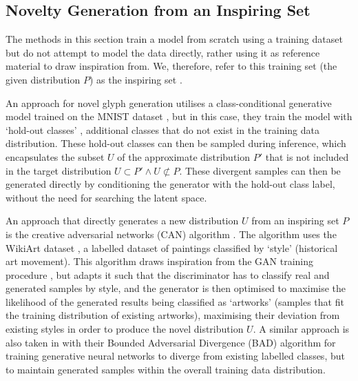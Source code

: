 \subsection{Novelty Generation from an Inspiring Set}
\label{survey:noveltygeneration}

The methods in this section train a model from scratch using a training dataset but do not attempt to model the data directly, rather using it as reference material to draw inspiration from. 
We, therefore, refer to this training set (the given distribution $P$) as the inspiring set \citep{ritchie2007some}.

An approach for novel glyph generation utilises a class-conditional generative model trained on the MNIST dataset \citep{lecun1998gradient}, but in this case, they train the model with `hold-out classes' \citep{cherti2017out}, additional classes that do not exist in the training data distribution. 
These hold-out classes can then be sampled during inference, which encapsulates the subset $U$ of the approximate distribution $P'$ that is not included in the target distribution $U \subset P' \wedge U \not\subset P$. 
These divergent samples can then be generated directly by conditioning the generator with the hold-out class label, without the need for searching the latent space. 

An approach that directly generates a new distribution $U$ from an inspiring set $P$ is the creative adversarial networks (CAN) algorithm \citep{elgammal2017can}. 
The algorithm uses the WikiArt dataset \citep{saleh2016large}, a labelled dataset of paintings classified by `style' (historical art movement). This algorithm draws inspiration from the GAN training procedure \citep{goodfellow2014generative}, but adapts it such that the discriminator has to classify real and generated samples by style, and the generator is then optimised to maximise the likelihood of the generated results being classified as `artworks' (samples that fit the training distribution of existing artworks), maximising their deviation from existing styles in order to produce the novel distribution $U$. A similar approach is also taken in \cite{chelma2022creative} with their Bounded Adversarial Divergence (BAD) algorithm for training generative neural networks to diverge from existing labelled classes, but to maintain generated samples within the overall training data distribution.

